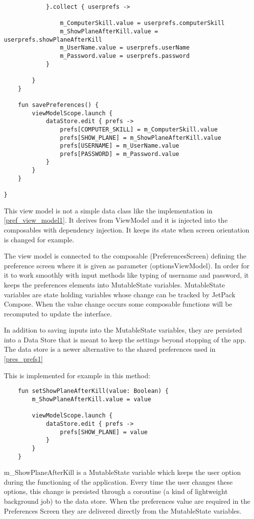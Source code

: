 \begin{lstlisting}
			}.collect { userprefs ->
				
				m_ComputerSkill.value = userprefs.computerSkill
				m_ShowPlaneAfterKill.value = userprefs.showPlaneAfterKill
				m_UserName.value = userprefs.userName
				m_Password.value = userprefs.password
			}
			
		}
	}
	
	fun savePreferences() {
		viewModelScope.launch {
			dataStore.edit { prefs ->
				prefs[COMPUTER_SKILL] = m_ComputerSkill.value
				prefs[SHOW_PLANE] = m_ShowPlaneAfterKill.value
				prefs[USERNAME] = m_UserName.value
				prefs[PASSWORD] = m_Password.value
			}
		}
	}
	
}
\end{lstlisting}

This view model is not a simple data class like the implementation in \ref{pref_view_model1}. It derives from ViewModel and it is injected into the composables with dependency injection. It keeps its state when screen orientation is changed for example. 

The view model is connected to the composable (PreferencesScreen) defining the preference screen where it is given as parameter (optionsViewModel). In order for it to work smoothly with input methods like typing of username and password, it keeps the preferences elements into MutableState variables. MutableState variables are state holding variables whose change can be tracked by JetPack Compose. When the value change occurs some composable functions will be recomputed to update the interface.

In addition to saving inputs into the MutableState variables, they are persisted into a Data Store that is meant to keep the settings beyond stopping of the app. The data store is a newer alternative to the shared preferences used in \ref{pres_prefs1}

This is implemented for example in this method:

\begin{lstlisting}
	fun setShowPlaneAfterKill(value: Boolean) {
		m_ShowPlaneAfterKill.value = value
		
		viewModelScope.launch {
			dataStore.edit { prefs ->
				prefs[SHOW_PLANE] = value
			}
		}
	}
\end{lstlisting}

m\_ShowPlaneAfterKill is a MutableState variable which keeps the user option during the functioning of the application. Every time the user changes these options, this change is persisted through a coroutine (a kind of lightweight background job) to the data store. When the preferences value are required in the Preferences Screen they are delivered directly from the MutableState variables.

